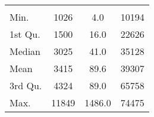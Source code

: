 \begin{tabular}{lS[table-format=5.1]S[table-format=5.1]S[table-format=5.1]}
&  &  &  \\
 Min.    & 1026 & 4.0 & 10194 \\
 1st Qu. & 1500 & 16.0 & 22626 \\
 Median  & 3025 & 41.0 & 35128 \\
 Mean    & 3415 & 89.6 & 39307 \\
 3rd Qu. & 4324 & 89.0 & 65758 \\
 Max.    & 11849 & 1486.0 & 74475 \\
\end{tabular}
